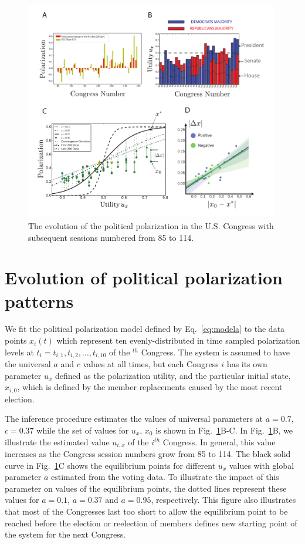 \begin{figure}
    \centering
    \includegraphics[width=0.99\textwidth]{img/chap4/Fig3.pdf}
    \caption{The evolution of the political polarization in the U.S. Congress with subsequent sessions numbered from 85 to 114.}
    \label{fig:fig3}
\end{figure}

\section{Evolution of political polarization patterns} \label{sec:4.3}
We fit the political polarization model defined by Eq.~\ref{eq:modela} to the data points $x_i(t)$ which represent ten evenly-distributed in time sampled polarization levels at $t_i=t_{i,1},t_{i,2},\dots,t_{i,10}$ of the $^{th}$ Congress. The system is assumed to have the universal $a$ and $c$ values at all times, but each Congress $i$ has its own parameter $u_x$ defined as the polarization utility, and the particular initial state, $x_{i,0}$, which is defined by the member replacements caused by the most recent election.

The inference procedure estimates the values of universal parameters at $a=0.7$, $c=0.37$ while the set of values for $u_x$, $x_0$ is shown in Fig.~\ref{fig:fig3}B-C. 
In Fig.~\ref{fig:fig3}B, we illustrate the estimated value $u_{i,x}$ of the $i^{th}$ Congress. In general, this value increases as the Congress session numbers grow from 85 to 114. The black solid curve in Fig.~\ref{fig:fig3}C shows the equilibrium points for different $u_x$ values with global parameter $a$ estimated from the voting data. To illustrate the impact of this parameter on values of the equilibrium points, the dotted lines represent these values for $a=0.1$, $a=0.37$ and $a=0.95$, respectively. This figure also illustrates that most of the Congresses last too short to allow the equilibrium point to be reached before the election or reelection of members defines new starting point of the system for the next Congress.


